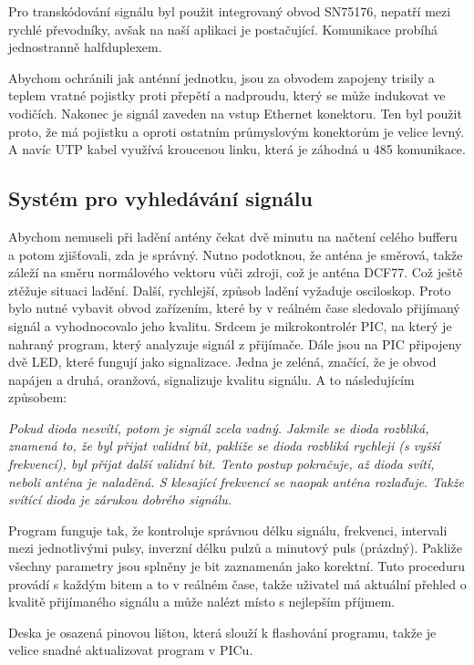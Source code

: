     Pro transkódování signálu byl použit integrovaný obvod SN75176, nepatří mezi rychlé
    převodníky, avšak na naší aplikaci je postačující. Komunikace probíhá jednostranně
    halfduplexem.

    Abychom ochránili jak anténní jednotku, jsou za obvodem zapojeny trisily a teplem
    vratné pojistky proti přepětí a nadproudu, který se může indukovat ve vodičích.
    Nakonec je signál zaveden na vstup Ethernet konektoru. Ten byl použit proto, že
    má pojistku a oproti ostatním průmyslovým konektorům je velice levný. A navíc UTP
    kabel využívá kroucenou linku, která je záhodná u 485 komunikace.

\subsection{Systém pro vyhledávání signálu}

    Abychom nemuseli při ladění antény čekat dvě minutu na načtení celého bufferu a potom
    zjišťovali, zda je správný. Nutno podotknou, že anténa je směrová, takže záleží na
    směru normálového vektoru vůči zdroji, což je anténa DCF77. Což ještě ztěžuje situaci
    ladění. Další, rychlejší, způsob ladění vyžaduje osciloskop. Proto bylo nutné vybavit
    obvod zařízením, které by v reálném čase sledovalo přijímaný signál a vyhodnocovalo
    jeho kvalitu.
    \newpage
    Srdcem je mikrokontrolér PIC, na který je nahraný program, který analyzuje signál z
    přijímače. Dále jsou na PIC připojeny dvě LED, které fungují jako signalizace. Jedna
    je zeléná, značící, že je obvod napájen a druhá, oranžová, signalizuje kvalitu
    signálu. A to následujícím způsobem:
    \vspace{1em}

    \-\hspace{0cm} \textit{Pokud dioda nesvítí, potom je signál zcela vadný. Jakmile se dioda
    rozbliká, znamená to, že byl přijat validní bit, pakliže se dioda rozbliká rychleji (s
    vyšší frekvencí), byl přijat další validní bit. Tento postup pokračuje, až dioda
    svítí, neboli anténa je naladěná. S klesající frekvencí se naopak anténa rozlaďuje.
    Takže svítící dioda je zárukou dobrého signálu. }
    \vspace{1em}

    Program funguje tak, že kontroluje správnou délku signálu, frekvenci, intervali mezi
    jednotlivými pulsy, inverzní délku pulzů a minutový puls (prázdný). Pakliže všechny
    parametry jsou splněny je bit zaznamenán jako korektní. Tuto proceduru provádí s
    každým bitem a to v reálném čase, takže uživatel má aktuální přehled o kvalitě
    přijímaného signálu a může nalézt místo s nejlepším příjmem.

    Deska je osazená pinovou lištou, která slouží k flashování programu, takže je velice
    snadné aktualizovat program v PICu.
